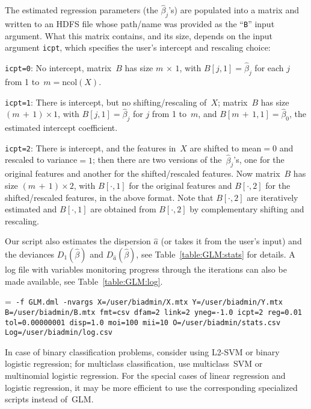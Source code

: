 \smallskip
{}
\smallskip

The estimated regression parameters (the $\hat{\beta}_j$'s) are populated into
a matrix and written to an HDFS file whose path/name was provided as the ``{\tt B}''
input argument.  What this matrix contains, and its size, depends on the input
argument {\tt icpt}, which specifies the user's intercept and rescaling choice:
\begin{Description}
\item[{\tt icpt=0}:] No intercept, matrix~$B$ has size $m\,{\times}\,1$, with
$B[j, 1] = \hat{\beta}_j$ for each $j$ from 1 to~$m = {}$ncol$(X)$.
\item[{\tt icpt=1}:] There is intercept, but no shifting/rescaling of~$X$; matrix~$B$
has size $(m\,{+}\,1) \times 1$, with $B[j, 1] = \hat{\beta}_j$ for $j$ from 1 to~$m$,
and $B[m\,{+}\,1, 1] = \hat{\beta}_0$, the estimated intercept coefficient.
\item[{\tt icpt=2}:] There is intercept, and the features in~$X$ are shifted to
mean${} = 0$ and rescaled to variance${} = 1$; then there are two versions of
the~$\hat{\beta}_j$'s, one for the original features and another for the
shifted/rescaled features.  Now matrix~$B$ has size $(m\,{+}\,1) \times 2$, with
$B[\cdot, 1]$ for the original features and $B[\cdot, 2]$ for the shifted/rescaled
features, in the above format.  Note that $B[\cdot, 2]$ are iteratively estimated
and $B[\cdot, 1]$ are obtained from $B[\cdot, 2]$ by complementary shifting and
rescaling.
\end{Description}
Our script also estimates the dispersion $\hat{a}$ (or takes it from the user's input)
and the deviances $D_1(\hat{\beta})$ and $D_{\hat{a}}(\hat{\beta})$, see
Table~\ref{table:GLM:stats} for details.  A log file with variables monitoring
progress through the iterations can also be made available, see Table~\ref{table:GLM:log}.

\smallskip
{}
\smallskip

{\hangindent=\parindent\noindent\tt
\hml -f GLM.dml -nvargs X=/user/biadmin/X.mtx Y=/user/biadmin/Y.mtx
  B=/user/biadmin/B.mtx fmt=csv dfam=2 link=2 yneg=-1.0 icpt=2 reg=0.01 tol=0.00000001
  disp=1.0 moi=100 mii=10 O=/user/biadmin/stats.csv Log=/user/biadmin/log.csv

}

\smallskip
{}
\smallskip

In case of binary classification problems, consider using L2-SVM or binary logistic
regression; for multiclass classification, use multiclass~SVM or multinomial logistic
regression.  For the special cases of linear regression and logistic regression, it
may be more efficient to use the corresponding specialized scripts instead of~GLM.
